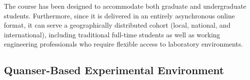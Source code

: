 \documentclass[journal]{IEEEtran}
\begin{document}
The course has been designed to accommodate both graduate and undergraduate students. Furthermore, since it is delivered in an entirely asynchronous online format, it can serve a geographically distributed cohort (local, national, and international), including traditional full-time students as well as working engineering professionals who require flexible access to laboratory environments.














\subsection{Quanser-Based Experimental Environment}
\end{document}
